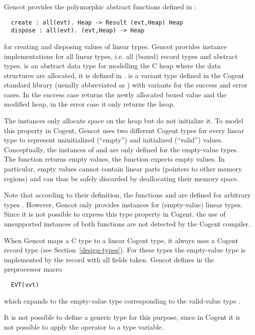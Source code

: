 Gencot provides the polymorphic abstract functions defined in :
\begin{verbatim}
  create : all(evt). Heap -> Result (evt,Heap) Heap
  dispose : all(evt). (evt,Heap) -> Heap
\end{verbatim}
for creating and disposing values of linear types. Gencot provides instance implementations for all linear
types, i.e. all (boxed) record types and abstract types.  is an abstract data type for modelling
the C heap where the data structures are allocated, it is defined in .
 is a variant type defined in the Cogent standard library (usually abbreviated as )
with variants for the success and error cases. In the success case  returns the newly allocated 
boxed value and the modified heap, in the error case it only returns the heap.

The  instances only allocate space on the heap but do not initialize it. To model this property in 
Cogent, Gencot uses two different Cogent types for every linear type to represent uninitialized (``empty'') and 
initialized (``valid'') values.
Conceptually, the instances of  and  are only defined for the empty-value types.
The function  returns empty values, the function  expects empty values. In particular,
empty values cannot contain linear parts (pointers to other memory regions) and can thus be safely discarded by 
deallocating their memory space. 

Note that according to their definition, the functions  and  are defined for arbitrary
types . However, Gencot only provides instances for (empty-value) linear types. Since it is not possible
to express this type property in Cogent, the use of unsupported instances of both functions are not detected by the 
Cogent compiler.

When Gencot maps a C type to a linear Cogent type, it always uses a Cogent record type (see Section~\ref{design-types}).
For these types the empty-value type is implemented by the record with all fields taken. Gencot defines in 
 the preprocessor macro
\begin{verbatim}
  EVT(vvt)
\end{verbatim}
which expands to the empty-value type  corresponding to the valid-value type . 

It is not possible to define a generic type for this purpose, since in Cogent it is not possible to apply the 
 operator to a type variable.

